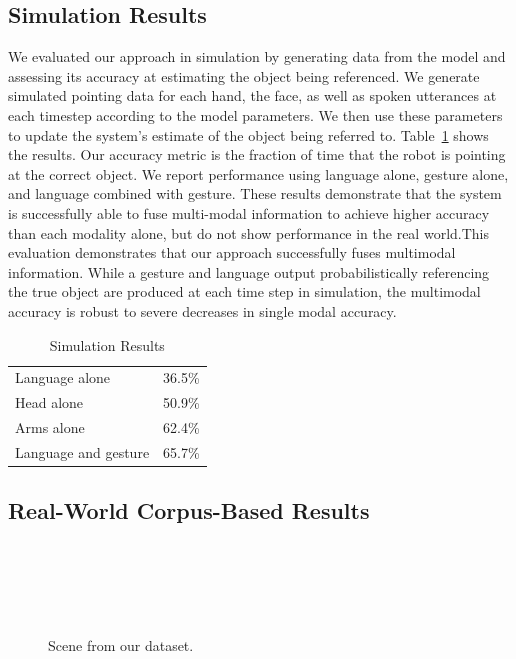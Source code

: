 \documentclass[letterpaper, 10 pt, conference]{ieeeconf}
\begin{document}
\subsection{Simulation Results}

We evaluated our approach in simulation by generating data from the
model and assessing its accuracy at estimating the object being
referenced.  We generate simulated pointing data for each hand, the
face, as well as spoken utterances at each timestep according to the
model parameters.  We then use these parameters to update the system's
estimate of the object being referred to.
Table~\ref{table:sim_results} shows the results.  Our accuracy metric
is the fraction of time that the robot is pointing at the correct
object.  We report performance using language alone, gesture alone,
and language combined with gesture.  These results demonstrate that
the system is successfully able to fuse multi-modal information to
achieve higher accuracy than each modality alone, but do not show
performance in the real world.This evaluation demonstrates that our
approach successfully fuses multimodal information.  While a gesture
and language output probabilistically referencing the true object are
produced at each time step in simulation, the multimodal accuracy is
robust to severe decreases in single modal accuracy.


\begin{table}
\centering
\caption{Simulation Results\label{table:sim_results}}
\begin{tabular}{lr}
Language alone &  36.5\%\\
Head alone & 50.9\%\\
Arms alone & 62.4\%\\
Language and gesture &  65.7\%
\end{tabular}

\end{table}

\subsection{Real-World Corpus-Based Results}

\begin{figure}
\parbox{1\linewidth}{~\\~\\~\\~\\}
\caption{Scene from our dataset.\label{fig:corpus_scene}}
\end{figure}
\end{document}
